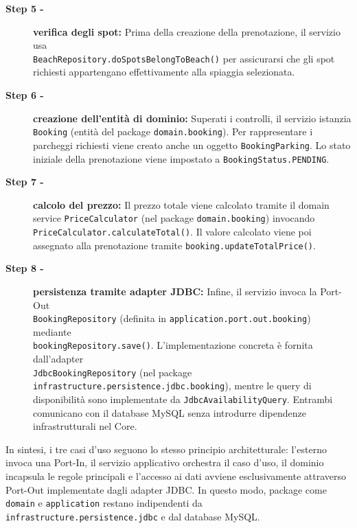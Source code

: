 \documentclass[a4paper,11pt]{article}
\begin{document}
\begin{description}
	\item[\textbf{Step 5 -}] \textbf{verifica degli spot:} Prima della creazione della prenotazione, il servizio usa \\ \texttt{BeachRepository.doSpotsBelongToBeach()} per assicurarsi che gli spot richiesti appartengano effettivamente alla spiaggia selezionata.
	
	\item[\textbf{Step 6 -}] \textbf{creazione dell'entità di dominio:} Superati i controlli, il servizio istanzia \texttt{Booking} (entità del package \texttt{domain.booking}). Per rappresentare i parcheggi richiesti viene creato anche un oggetto \texttt{BookingParking}. Lo stato iniziale della prenotazione viene impostato a \texttt{BookingStatus.PENDING}.

	
	\item[\textbf{Step 7 -}] \textbf{calcolo del prezzo:} Il prezzo totale viene calcolato tramite il domain service \texttt{PriceCalculator} (nel package \texttt{domain.booking}) invocando \texttt{PriceCalculator.calculateTotal()}. Il valore calcolato viene poi assegnato alla prenotazione tramite \texttt{booking.updateTotalPrice()}.
	
	\item[\textbf{Step 8 -}] \textbf{persistenza tramite adapter JDBC:} Infine, il servizio invoca la Port-Out \\ \texttt{BookingRepository} (definita in \texttt{application.port.out.booking}) mediante \\ \texttt{bookingRepository.save()}. L'implementazione concreta è fornita dall'adapter \\ \texttt{JdbcBookingRepository} (nel package \texttt{infrastructure.persistence.jdbc.booking}), mentre le query di disponibilità sono implementate da \texttt{JdbcAvailabilityQuery}. Entrambi comunicano con il database MySQL senza introdurre dipendenze infrastrutturali nel Core.
\end{description}

In sintesi, i tre casi d'uso seguono lo stesso principio architetturale: l'esterno invoca una Port-In, il servizio applicativo orchestra il caso d'uso, il dominio incapsula le regole principali e l'accesso ai dati avviene esclusivamente attraverso Port-Out implementate dagli adapter JDBC. In questo modo, package come \texttt{domain} e \texttt{application} restano indipendenti da \texttt{infrastructure.persistence.jdbc} e dal database MySQL.
\end{document}

